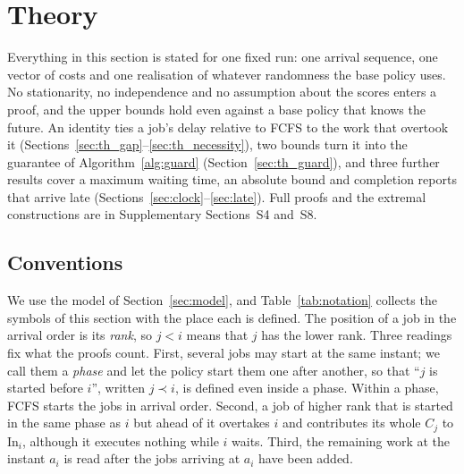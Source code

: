 \providecommand{\devnum}[1]{#1}

\section{Theory}
\label{sec:theory}

Everything in this section is stated for one fixed run: one arrival sequence, one vector of
costs and one realisation of whatever randomness the base policy uses. No stationarity, no
independence and no assumption about the scores enters a proof, and the upper bounds hold
even against a base policy that knows the future. An identity ties a job's delay relative
to FCFS to the work that overtook it (Sections~\ref{sec:th_gap}--\ref{sec:th_necessity}),
two bounds turn it into the guarantee of Algorithm~\ref{alg:guard}
(Section~\ref{sec:th_guard}), and three further results cover a maximum waiting time, an
absolute bound and completion reports that arrive late
(Sections~\ref{sec:clock}--\ref{sec:late}). Full proofs and the extremal constructions are
in Supplementary Sections~S4 and~S8.

\subsection{Conventions}
\label{sec:conventions}

We use the model of Section~\ref{sec:model}, and Table~\ref{tab:notation} collects the
symbols of this section with the place each is defined. The position of a job in the
arrival order is its \emph{rank}, so $j < i$ means that $j$ has the lower rank. Three
readings fix what the proofs count. First, several jobs may start at the same instant; we
call them a \emph{phase} and let the policy start them one after another, so that
``$j$ is started before $i$'', written $j \prec i$, is defined even inside a phase. Within
a phase, FCFS starts the jobs in arrival order. Second, a job of higher rank that is started
in the same phase as $i$ but ahead of it overtakes $i$ and contributes its whole $C_j$ to
$\mathrm{In}_i$, although it executes nothing while $i$ waits. Third, the remaining work at
the instant $a_i$ is read after the jobs arriving at $a_i$ have been added.

